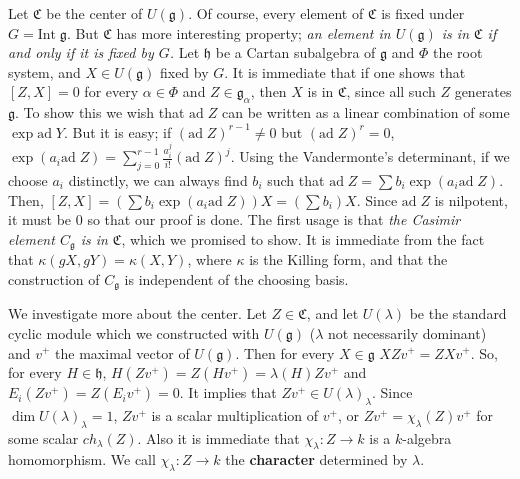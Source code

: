 \documentclass{article}
\newcommand{\lie}[1]{\mathfrak{#1}}
\newcommand{\ad}[1]{\mathrm{ad}\; #1}
\begin{document}
Let $\mathfrak{C}$ be the center of $U(\lie{g})$.
Of course, every element of $\mathfrak{C}$ is fixed under $G = \textrm{Int}\; \lie{g}$.
But $\mathfrak{C}$ has more interesting property; \textit{an element in $U(\lie{g})$ is in $\mathfrak{C}$ if and only if it is fixed by $G$.}
Let $\lie{h}$ be a Cartan subalgebra of $\lie{g}$ and $\Phi$ the root system, and $X \in U(\lie{g})$ fixed by $G$.
It is immediate that if one shows that $[Z, X] = 0$ for every $\alpha \in \Phi$ and $Z \in \lie{g}_\alpha$, then $X$ is in $\mathfrak{C}$, since all such $Z$ generates $\lie{g}$.
To show this we wish that $\ad{Z}$ can be written as a linear combination of some $\exp{\ad{Y}}$.
But it is easy; if $(\ad{Z})^{r - 1} \ne 0$ but $(\ad{Z})^r = 0$, $\exp{(a_i \ad{Z})} = \sum_{j = 0}^{r - 1} \frac{a_i^j}{i!} (\ad{Z})^j$.
Using the Vandermonte's determinant, if we choose $a_i$ distinctly, we can always find $b_i$ such that $\ad{Z} = \sum b_i \exp{(a_i \ad{Z})}$.
Then, $[Z, X] = (\sum b_i \exp{(a_i \ad{Z})}) X = (\sum b_i)X$.
Since $\ad{Z}$ is nilpotent, it must be 0 so that our proof is done.
The first usage is that \textit{the Casimir element $C_\lie{g}$ is in $\mathfrak{C}$}, which we promised to show.
It is immediate from the fact that $\kappa(gX, gY) = \kappa(X, Y)$, where $\kappa$ is the Killing form, and that the construction of $C_\lie{g}$ is independent of the choosing basis.

We investigate more about the center.
Let $Z \in \mathfrak{C}$, and let $U(\lambda)$ be the standard cyclic module which we constructed with $U(\lie{g})$ ($\lambda$ not necessarily dominant) and $v^+$ the maximal vector of $U(\lie{g})$.
Then for every $X \in \lie{g}$ $XZv^+ = ZXv^+$.
So, for every $H \in \lie{h}$, $H(Zv^+) = Z(Hv^+) = \lambda(H) Zv^+$ and $E_i(Zv^+) = Z(E_i v^+) = 0$.
It implies that $Zv^+ \in U(\lambda)_\lambda$.
Since $\dim{U(\lambda)_\lambda} = 1$, $Zv^+$ is a scalar multiplication of $v^+$, or $Zv^+ = \chi_\lambda(Z) v^+$ for some scalar $ch_\lambda(Z)$.
Also it is immediate that $\chi_\lambda : Z \to k$ is a $k$-algebra homomorphism.
We call $\chi_\lambda : Z \to k$ the \textbf{character} determined by $\lambda$.
\end{document}

